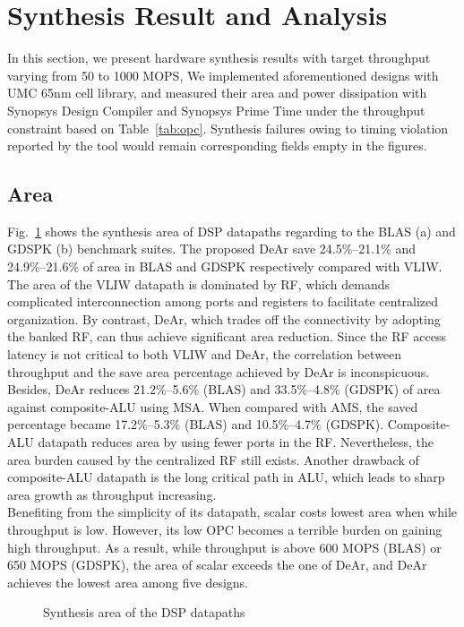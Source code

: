 \section{Synthesis Result and Analysis}
{
    In this section, we present hardware synthesis results with target throughput varying from 50 to 1000 MOPS, 
    We implemented aforementioned designs with UMC 65nm cell library, 
    and measured their area and power dissipation with Synopsys Design Compiler and Synopsys Prime Time under the throughput constraint based on Table~\ref{tab:opc}.
    Synthesis failures owing to timing violation reported by the tool would remain corresponding fields empty in the figures.
    \subsection{Area}
    Fig.~\ref{chart:area} shows the synthesis area of DSP datapaths regarding to the BLAS (a) and GDSPK (b) benchmark suites.
    The proposed DeAr save 24.5\%--21.1\% and 24.9\%--21.6\% of area in BLAS and GDSPK respectively compared with VLIW.
    The area of the VLIW datapath is dominated by RF, 
    which demands complicated interconnection among ports and registers to facilitate centralized organization.
    By contrast, DeAr, which trades off the connectivity by adopting the banked RF, can thus achieve significant area reduction.
    Since the RF access latency is not critical to both VLIW and DeAr, 
    the correlation between throughput and the save area percentage achieved by DeAr is inconspicuous.
    \\\indent Besides, DeAr reduces 21.2\%--5.6\% (BLAS) and 33.5\%--4.8\% (GDSPK) of area against composite-ALU using MSA.
    When compared with AMS, the saved percentage became 17.2\%--5.3\% (BLAS) and 10.5\%--4.7\% (GDSPK).
    Composite-ALU datapath reduces area by using fewer ports in the RF.
    Nevertheless, the area burden caused by the centralized RF still exists.
    Another drawback of composite-ALU datapath is the long critical path in ALU, 
    which leads to sharp area growth as throughput increasing.
    \\\indent Benefiting from the simplicity of its datapath, 
    scalar costs lowest area when while throughput is low.
    However, its low OPC becomes a terrible burden on gaining high throughput.
    As a result, while throughput is above 600 MOPS (BLAS) or 650 MOPS (GDSPK), 
    the area of scalar exceeds the one of DeAr, 
    and DeAr achieves the lowest area among five designs.
    \vspace{\textfig}
    \begin{figure}[!ht]
        \begin{center}
        \end{center}
        \caption{Synthesis area of the DSP datapaths}
        \label{chart:area}
    \end{figure}
}
